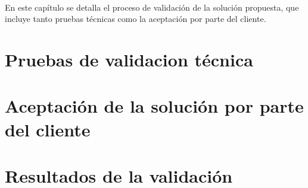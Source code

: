 \label{cap:validacion}
\mbox{}\\
\noindent
En este capítulo se detalla el proceso de validación de la solución propuesta, que incluye tanto pruebas técnicas como la aceptación por parte del cliente. 
\section{Pruebas de validacion técnica}

\section{Aceptación de la solución por parte del cliente}

\section{Resultados de la validación}


